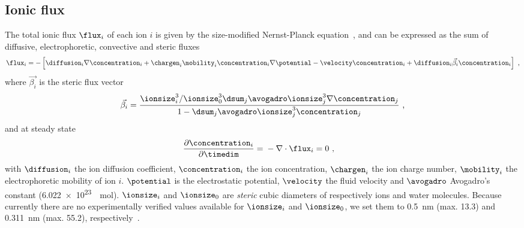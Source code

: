 \subsection{Ionic flux}
%

The total ionic flux $\flux_{i}$ of each ion $i$ is given by the size-modified Nernst-Planck
equation~\cite{Lu-2011}, and can be expressed as the sum of diffusive, electrophoretic, convective and steric
fluxes
%
\begin{align}
  \label{eq:sm-nernst-planck}
  \flux_{i} = -\left[
    \diffusion_{i} \nabla \concentration_{i}
    + \chargen_{i} \mobility_{i} \concentration_{i} \nabla \potential
    - \velocity \concentration_{i}
    + \diffusion_{i} \vec{\beta_{i}} \concentration_{i} \right]
  \text{ ,}
\end{align}
%
where $\vec{\beta_{i}}$ is the steric flux vector
%
\begin{align}\label{eq:epnp-ns_steric_flux_vector}
  \vec{\beta_{i}} =
      \frac{ \ionsize_{i}^3 / \ionsize_{0}^3 \dsum_{j} \avogadro \ionsize_{j}^3 \nabla \concentration_{j} }
          { 1 - \dsum_{j} \avogadro \ionsize_{j}^3 \concentration_{j} }
  \text{ ,}
\end{align}
%
and at steady state
%
\begin{align}
  \dfrac{\partial \concentration_{i}}{\partial \timedim} ={}& - \nabla \cdot \flux_{i} = 0
  \text{ ,}
\end{align}
%
with $\diffusion_{i}$ the ion diffusion coefficient, $\concentration_{i}$ the ion concentration,
$\chargen_{i}$ the ion charge number, $\mobility_{i}$ the electrophoretic mobility of ion $i$. $\potential$ is
the electrostatic potential, $\velocity$ the fluid velocity and $\avogadro$ Avogadro's constant
(\SI{6.022e23}{\per\mole}). $\ionsize_{i}$ and $\ionsize_{0}$ are \emph{steric} cubic diameters of
respectively ions and water molecules. Because currently there are no experimentally verified values available
for $\ionsize_{i}$ and $\ionsize_{0}$, we set them to \SI{0.5}{\nm} (max. \SI{13.3}{\Molar}) and
\SI{0.311}{\nm} (max. \SI{55.2}{\Molar}), respectively~\cite{Bazant-2009}.

